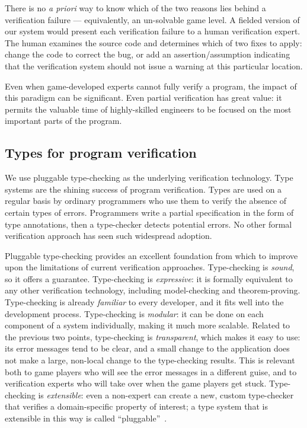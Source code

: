 \documentclass[preprint]{sig-alternate}
\newcommand{\todo}[1]{\relax}
\begin{document}
\noindent
There is no \emph{a priori} way to know which of the two reasons lies
behind a verification failure --- equivalently, an un-solvable game
level.  A fielded version of our system would present each verification failure to a human
verification expert.  The human examines the source code and
determines which of two fixes to apply: change the code to correct the
bug, or add an assertion/assumption indicating that the verification
system should not issue a warning at this particular location.


Even when game-developed experts cannot fully verify
a program, the impact of this paradigm can be significant.  Even
partial verification has great value: it permits the valuable time of
highly-skilled engineers to be focused on the most important parts of
the program.

\subsection{Types for program verification}

\todo{How much motivation should we keep for FTfJP?}

We use pluggable type-checking as the underlying verification
technology.  Type systems are the shining success of program
verification.  Types are used on a regular basis by ordinary
programmers who use them to verify the absence of certain types of
errors.  Programmers write a partial specification in the form of type
annotations, then a type-checker detects potential errors.  No other
formal verification approach has seen such widespread adoption.

Pluggable type-checking provides an excellent foundation from which to
improve upon the limitations of current verification
approaches. Type-checking is \emph{sound}, so it offers a guarantee.
Type-checking is \emph{expressive}: it is formally equivalent
\cite{CurryHoward2006,MartinLoef1984,CoquandHuet1988,Cousot1997,CousotCousot2000,NaikPalsberg2005}
to any other verification technology, including model-checking and
theorem-proving.  Type-checking is already \emph{familiar} to every
developer, and it fits well into the development process.
Type-checking is \emph{modular}: it can be done on each component of a
system individually, making it much more scalable.  Related to the
previous two points, type-checking is \emph{transparent}, which makes
it easy to use: its error messages tend to be clear, and a small
change to the application does not make a large, non-local change to
the type-checking results.  This is relevant both to game players who
will see the error messages in a different guise, and to verification
experts who will take over when the game players get stuck.
Type-checking is \emph{extensible}: even a non-expert can create a
new, custom type-checker that verifies a domain-specific property of
interest; a type system that is extensible in this way is called
``pluggable''~\cite{Bracha2004}.
\end{document}
